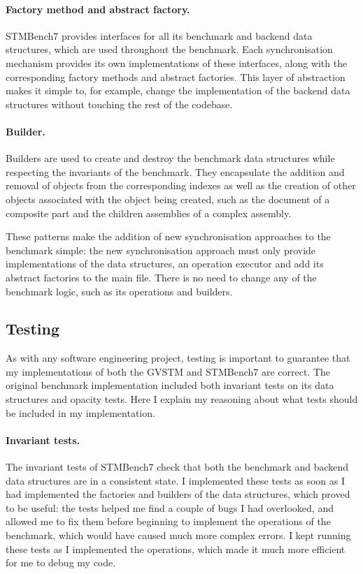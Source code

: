 \documentclass[12pt,a4paper,oneside,openright]{report}
\begin{document}
\paragraph{Factory method and abstract factory.} STMBench7 provides
interfaces for all its benchmark and backend data structures, which
are used throughout the benchmark. Each synchronisation mechanism
provides its own implementations of these interfaces, along with the
corresponding factory methods and abstract factories. This layer of
abstraction makes it simple to, for example, change the implementation
of the backend data structures without touching the rest of the
codebase.

\paragraph{Builder.} Builders are used to create and destroy the
benchmark data structures while respecting the invariants of the
benchmark. They encapsulate the addition and removal of objects from
the corresponding indexes as well as the creation of other objects
associated with the object being created, such as the document of a
composite part and the children assemblies of a complex assembly.

\medskip

These patterns make the addition of new synchronisation approaches to
the benchmark simple: the new synchronisation approach must only
provide implementations of the data structures, an operation executor
and add its abstract factories to the main file. There is no need to
change any of the benchmark logic, such as its operations and
builders.

\subsection{Testing}
\label{sec:impl:testing}

As with any software engineering project, testing is important to
guarantee that my implementations of both the GVSTM and STMBench7 are
correct. The original benchmark implementation included both invariant
tests on its data structures and opacity tests. Here I explain my
reasoning about what tests should be included in my implementation.

\paragraph{Invariant tests.} The invariant tests of STMBench7 check
that both the benchmark and backend data structures are in a
consistent state. I implemented these tests as soon as I had
implemented the factories and builders of the data structures, which
proved to be useful: the tests helped me find a couple of bugs I had
overlooked, and allowed me to fix them before beginning to implement
the operations of the benchmark, which would have caused much more
complex errors. I kept running these tests as I implemented the
operations, which made it much more efficient for me to debug my code.
\end{document}
